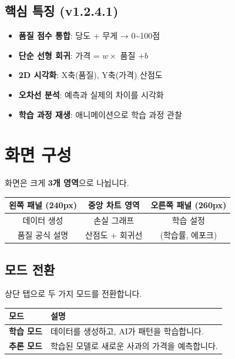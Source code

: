 \documentclass[11pt,a4paper]{article}
\begin{document}
\subsection{핵심 특징 (v1.2.4.1)}

\begin{itemize}[leftmargin=*]
    \item \textbf{품질 점수 통합}: 당도 + 무게 → 0\textasciitilde100점
    \item \textbf{단순 선형 회귀}: 가격 = $w \times$ 품질 $+ b$
    \item \textbf{2D 시각화}: X축(품질), Y축(가격) 산점도
    \item \textbf{오차선 분석}: 예측과 실제의 차이를 시각화
    \item \textbf{학습 과정 재생}: 애니메이션으로 학습 과정 관찰
\end{itemize}

\section{화면 구성}

화면은 크게 \textbf{3개 영역}으로 나뉩니다.

\begin{center}
\begin{tabular}{|c|c|c|}
\hline
\rowcolor{bgblue}
\textbf{왼쪽 패널 (240px)} & \textbf{중앙 차트 영역} & \textbf{오른쪽 패널 (260px)} \\
\hline
데이터 생성 & 손실 그래프 & 학습 설정 \\
품질 공식 설명 & 산점도 + 회귀선 & (학습률, 에포크) \\
\hline
\end{tabular}
\end{center}

\subsection{모드 전환}

상단 탭으로 두 가지 모드를 전환합니다.

\begin{center}
\begin{tabular}{|l|p{8cm}|}
\hline
\rowcolor{bggreen}
\textbf{모드} & \textbf{설명} \\
\hline
\textbf{학습 모드} & 데이터를 생성하고, AI가 패턴을 학습합니다. \\
\hline
\textbf{추론 모드} & 학습된 모델로 새로운 사과의 가격을 예측합니다. \\
\hline
\end{tabular}
\end{center}
\end{document}
